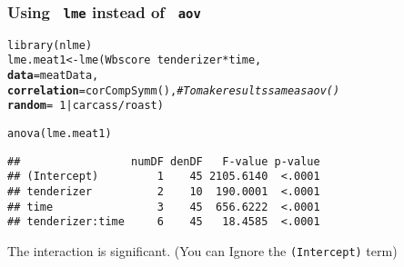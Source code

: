 \documentclass[color=usenames,dvipsnames]{beamer}\usepackage[]{graphicx}\usepackage[]{color}
\makeatletter
\newcommand{\hlnum}[1]{\textcolor[rgb]{0.69,0.494,0}{#1}}%
\newcommand{\hlcom}[1]{\textcolor[rgb]{0.514,0.506,0.514}{\textit{#1}}}%
\newcommand{\hlopt}[1]{\textcolor[rgb]{0,0,0}{#1}}%
\newcommand{\hlstd}[1]{\textcolor[rgb]{0,0,0}{#1}}%
\newcommand{\hlkwb}[1]{\textcolor[rgb]{0,0.341,0.682}{#1}}%
\newcommand{\hlkwc}[1]{\textcolor[rgb]{0,0,0}{\textbf{#1}}}%
\newcommand{\hlkwd}[1]{\textcolor[rgb]{0.004,0.004,0.506}{#1}}%
\newenvironment{kframe}{%
 \def\at@end@of@kframe{}%
 \ifinner\ifhmode%
  \def\at@end@of@kframe{\end{minipage}}%
  \begin{minipage}{\columnwidth}%
 \fi\fi%
 \def\FrameCommand##1{\hskip\@totalleftmargin \hskip-\fboxsep
 \colorbox{shadecolor}{##1}\hskip-\fboxsep
     \hskip-\linewidth \hskip-\@totalleftmargin \hskip\columnwidth}%
 \MakeFramed {\advance\hsize-\width
   \@totalleftmargin\z@ \linewidth\hsize
   \@setminipage}}%
 {\par\unskip\endMakeFramed%
 \at@end@of@kframe}
\newenvironment{knitrout}{}{} %
\newcommand{\inr}[1]{\colorbox{inlinecolor}{\texttt{#1}}}
\makeatother
\begin{document}
\begin{frame}[fragile]
  \frametitle{Using \inr{ lme} instead of \inr{ aov}}
\small
\begin{knitrout}\footnotesize
{}\color{fgcolor}\begin{kframe}
\begin{alltt}
\hlkwd{library}\hlstd{(nlme)}
\hlstd{lme.meat1} \hlkwb{<-} \hlkwd{lme}\hlstd{(Wbscore} \hlopt{~} \hlstd{tenderizer}\hlopt{*}\hlstd{time,}
    \hlkwc{data}\hlstd{=meatData,}
    \hlkwc{correlation}\hlstd{=}\hlkwd{corCompSymm}\hlstd{(),} \hlcom{# To make results same as aov()}
    \hlkwc{random} \hlstd{=} \hlopt{~}\hlnum{1}\hlopt{|}\hlstd{carcass}\hlopt{/}\hlstd{roast)}
\end{alltt}
\end{kframe}
\end{knitrout}
\pause
\begin{knitrout}\footnotesize
{}\color{fgcolor}\begin{kframe}
\begin{alltt}
\hlkwd{anova}\hlstd{(lme.meat1)}
\end{alltt}
\begin{verbatim}
##                 numDF denDF   F-value p-value
## (Intercept)         1    45 2105.6140  <.0001
## tenderizer          2    10  190.0001  <.0001
## time                3    45  656.6222  <.0001
## tenderizer:time     6    45   18.4585  <.0001
\end{verbatim}
\end{kframe}
\end{knitrout}
The interaction is significant. (You can Ignore the {\tt (Intercept)} term)
\end{frame}
\end{document}
